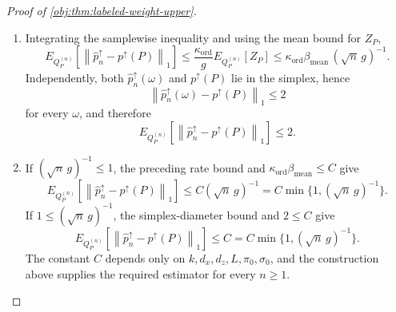 \documentclass[11pt]{article}
\begin{document}
\begin{proof}[Proof of \cref{obj:thm:labeled-weight-upper}]
\begin{enumerate}
\item
Integrating the samplewise inequality and using the mean bound for \(Z_P\),
\[
E_{Q_P^{(n)}}\!\left[
\left\|\widehat p_n^{\uparrow}-p^{\uparrow}(P)\right\|_1
\right]
\le
\frac{\kappa_{\mathrm{ord}}}{g}E_{Q_P^{(n)}}[Z_P]
\le
\kappa_{\mathrm{ord}}\beta_{\mathrm{mean}}\,
(\sqrt n\,g)^{-1}.
\]
Independently, both \(\widehat p_n^{\uparrow}(\omega)\) and \(p^{\uparrow}(P)\) lie in the simplex, hence
\[
\left\|\widehat p_n^{\uparrow}(\omega)-p^{\uparrow}(P)\right\|_1\le2
\]
for every \(\omega\), and therefore
\[
E_{Q_P^{(n)}}\!\left[
\left\|\widehat p_n^{\uparrow}-p^{\uparrow}(P)\right\|_1
\right]\le2 .
\] %

\item
If \((\sqrt n\,g)^{-1}\le1\), the preceding rate bound and
\(\kappa_{\mathrm{ord}}\beta_{\mathrm{mean}}\le C\) give
\[
E_{Q_P^{(n)}}\!\left[
\left\|\widehat p_n^{\uparrow}-p^{\uparrow}(P)\right\|_1
\right]
\le
C(\sqrt n\,g)^{-1}
=
C\min\{1,(\sqrt n\,g)^{-1}\}.
\]
If \(1\le(\sqrt n\,g)^{-1}\), the simplex-diameter bound and \(2\le C\) give
\[
E_{Q_P^{(n)}}\!\left[
\left\|\widehat p_n^{\uparrow}-p^{\uparrow}(P)\right\|_1
\right]
\le
C
=
C\min\{1,(\sqrt n\,g)^{-1}\}.
\]
The constant \(C\) depends only on \(k,d_x,d_z,L,\pi_0,\sigma_0\), and the construction above supplies the required estimator for every \(n\ge1\). %
\end{enumerate}
\end{proof}
\end{document}
